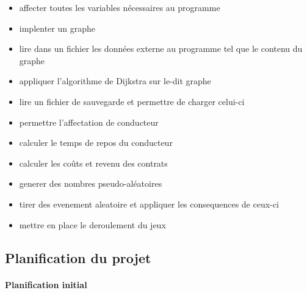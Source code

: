 \documentclass[a4paper, 12pt]{article}
\begin{document}
        \begin{itemize}
            \item affecter toutes les variables nécessaires au programme
            \item implenter un graphe
            \item lire dans un fichier les données externe au programme tel que le contenu du graphe
            \item appliquer l'algorithme de Dijkstra sur le-dit graphe
            \item lire un fichier de sauvegarde et permettre de charger celui-ci
            \item permettre l'affectation de conducteur
            \item calculer le temps de repos du conducteur
            \item calculer les coûts et revenu des contrats
            \item generer des nombres pseudo-aléatoires
            \item tirer des evenement aleatoire et appliquer les consequences de ceux-ci
            \item mettre en place le deroulement du jeux
            
        \end{itemize}
    \subsection{Planification du projet}
        \paragraph{Planification initial\newline\newline}
    
\end{document}
